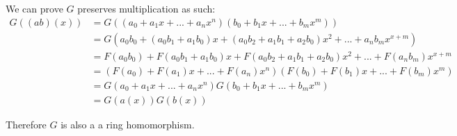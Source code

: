 \documentclass{article}
\begin{document}
\begin{enumerate}
We can prove $G$ preserves multiplication as such:
\begin{align*}
G((ab)(x)) &= G((a_0 + a_{1}x + ... + a_{n}x^{n})(b_0 + b_{1}x + ... + b_{m}x^{m})) \\
&= G(a_{0}b_{0} + (a_{0}b_{1} + a_{1}b_{0})x + (a_{0}b_{2} + a_{1}b_{1} + a_{2}b_{0})x^2 + ... + a_{n}b_{m}x^{x+m}) \\
&= F(a_{0}b_{0}) + F(a_{0}b_{1} + a_{1}b_{0})x + F(a_{0}b_{2} + a_{1}b_{1} + a_{2}b_{0})x^2 + ... + F(a_{n}b_{m})x^{x+m} \\
&= (F(a_{0}) + F(a_{1})x + ... + F(a_{n})x^{n})(F(b_{0}) + F(b_{1})x + ... + F(b_{m})x^{m}) \\
&= G(a_0 + a_{1}x + ... + a_{n}x^{n})G(b_0 + b_{1}x + ... + b_{m}x^{m}) \\
&= G(a(x))G(b(x))
\end{align*}

Therefore $G$ is also a a ring homomorphism.

\end{enumerate}
\end{document}
